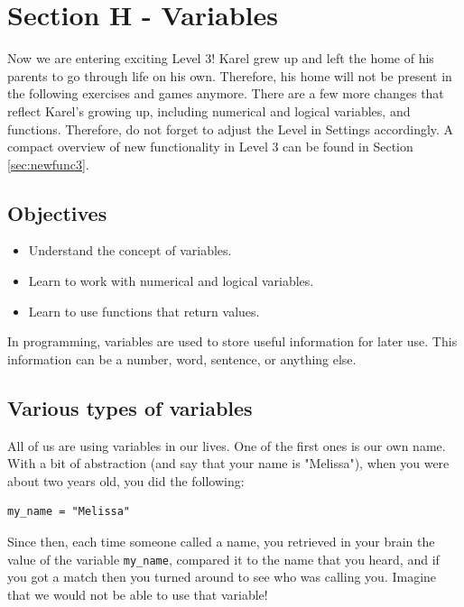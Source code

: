 {{{{%

\section{Section H - Variables} \label{sec:var}

Now we are entering exciting Level 3! Karel grew up and left the home of his 
parents to go through life on his own. Therefore, his home will not be present
in the following exercises and games anymore. There are a few more changes
that reflect Karel's growing up, including numerical and logical variables,
and functions. Therefore, do not forget to adjust the 
Level in Settings accordingly. A compact overview of new functionality in Level 3
can be found in Section \ref{sec:newfunc3}.

\subsection{Objectives} 
 
\begin{itemize}
\item Understand the concept of variables.
\item Learn to work with numerical and logical variables.
\item Learn to use functions that return values. 
\end{itemize}

\noindent
In programming, variables are used to store useful information for later use. This information can 
be a number, word, sentence, or anything else. 

\subsection{Various types of variables}

All of us are using variables in our lives. One of 
the first ones is our own name. With a bit of abstraction (and say that your name is "Melissa"), 
when you were about two years old, you did the following:

\begin{verbatim}
my_name = "Melissa"
\end{verbatim}
Since then, each time someone called a name, you retrieved in your brain the value of the variable
{\tt my\_name}, compared it to the name that you heard, and if you got a match then you turned around 
to see who was calling you. Imagine that we would not be able to use that variable!

}}}}

